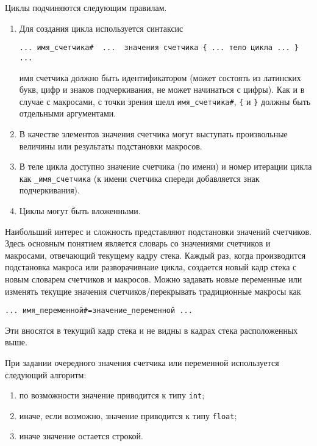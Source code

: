 \documentclass[12pt]{article}
\begin{document}
Циклы подчиняются следующим правилам.
\begin{enumerate}
\item 
Для создания цикла используется синтаксис
\begin{verbatim}
... имя_счетчика#  ...  значения счетчика { ... тело цикла ... } ...
\end{verbatim}
имя счетчика должно быть идентификатором (может состоять из латинских букв, цифр и знаков подчеркивания, не может начинаться с цифры).
Как и в случае с макросами, с точки зрения шелл \verb'имя_счетчика#', \verb'{' и \verb'}' должны быть отдельными аргументами.
\item В качестве элементов значения счетчика могут выступать произвольные величины или результаты подстановки макросов.
\item В теле цикла доступно значение счетчика (по имени) и номер итерации цикла как \verb'_имя_счетчика' (к имени счетчика спереди добавляется знак подчеркивания).
\item Циклы могут быть вложенными.
\end{enumerate}

Наибольший интерес и сложность представляют подстановки значений счетчиков. Здесь основным понятием является словарь со значениями
счетчиков и макросами, отвечающий текущему кадру стека. 
Каждый раз, когда производится подстановка  макроса или разворачивнаие цикла, создается новый кадр стека с новым словарем счетчиков и макросов.
Можно задавать новые переменные или изменять текущие значения счетчиков/перекрывать традиционные макросы как
\begin{verbatim}
... имя_переменной#=значение_переменной ...
\end{verbatim}
Эти вносятся в текущий кадр стека и не видны в кадрах стека расположенных выше.

При задании очередного значения счетчика или переменной используется следующий алгоритм:
\begin{enumerate}
\item по возможности значение приводится к типу \verb'int';
\item иначе, если возможно, значение приводится к типу \verb'float';
\item иначе значение остается строкой.
\end{enumerate}
\end{document}
